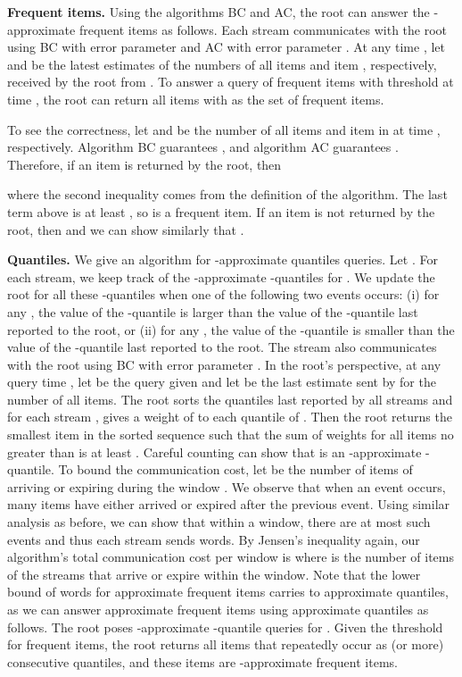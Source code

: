\documentclass[proceedings]{stacs}
\theoremstyle{definition}\newtheorem{fact}{Fact}
\begin{document}
\vspace{.5ex}
{\bf Frequent items.}
Using the algorithms BC and AC, the root can
answer the -approximate frequent items as follows.
Each stream  communicates with the root using BC
with error parameter 
and AC with error parameter .
At any time ,
let  and  be the latest estimates of
the numbers of all items and item , respectively,
received by the root from .  To answer
a query of frequent items with threshold
 at time ,
the root can return all items  with  as the set of frequent
items.

To see the correctness, let  and 
be the number of all items and item  in  at time , respectively.
Algorithm BC guarantees ,
and algorithm AC guarantees .
Therefore, if an item  is returned by the root, then

where the second inequality comes from the definition of the algorithm.
The last term above is at least ,
so  is a frequent item.
If an item  is not returned by the root, then  and we can
show similarly that .


\vspace{.5ex}
{\bf Quantiles.}
We give an algorithm for
-approximate quantiles queries.
Let .
For each stream, we keep track of the -approximate -quantiles
for .
We update the root for all these -quantiles when one of the following two events occurs:
(i) for any , the value of the -quantile is
larger than the value of the -quantile last reported to the root, or
(ii) for any , the value of the -quantile is
smaller than the value of the -quantile last reported to the root.
The stream also communicates with the root using BC with
error parameter . In the root's perspective,
at any query time , let  be the
query given and let  be the last estimate sent by
 for the number of all items.
The root sorts the quantiles last reported by all streams
and for each stream , gives a weight of  to each quantile of .
Then the root returns the smallest item  in the sorted sequence such that
the sum of weights for all items no greater than  is at least .
Careful counting can show that  is
an -approximate -quantile.
  {To bound the communication cost, let  be
the number of items of  arriving or expiring during the window
.}
We observe that
when an event occurs, many items have either arrived or expired
after the previous event.
Using similar analysis as before,
we can show that within a window, there are at most  such events
and thus each stream sends 
words.
  {By Jensen's inequality again, our algorithm's
 total communication cost per window is 
where  is the number of items of the  streams
that arrive or expire within the window.}
Note that the lower bound of  words
for approximate frequent items carries to approximate quantiles,
as we can answer approximate frequent items using approximate
quantiles as follows. The root poses -approximate
-quantile queries
for .
Given the threshold  for frequent items,
the root returns all items that repeatedly occur as  (or more) consecutive quantiles,
and these items are -approximate frequent items.
\end{document}
